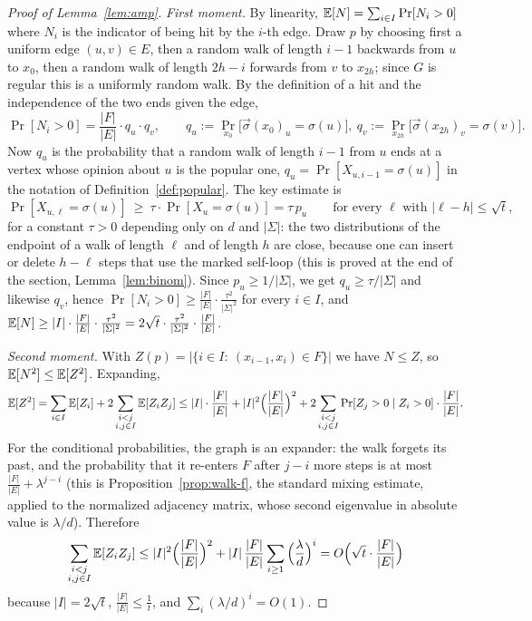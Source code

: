 \begin{proof}[Proof of Lemma~\ref{lem:amp}]
\medskip
\noindent\emph{First moment.}  By linearity, $\operatorname*{\mathbb{E}}[N]=\sum_{i\in I}\Pr[N_i>0]$ where $N_i$ is the indicator of being hit by the $i$-th edge.  Draw $p$ by choosing first a uniform edge $(u,v)\in E$, then a random walk of length $i-1$ backwards from $u$ to $x_0$, then a random walk of length $2h-i$ forwards from $v$ to $x_{2h}$; since $G$ is regular this is a uniformly random walk.
By the definition of a hit and the independence of the two ends given the edge,
\[
  \Pr[N_i>0]=\frac{|F|}{|E|}\cdot q_u\cdot q_v,\qquad q_u:=\Pr_{x_0}\big[\vec\sigma(x_0)_u=\sigma(u)\big],\ q_v:=\Pr_{x_{2h}}\big[\vec\sigma(x_{2h})_v=\sigma(v)\big].
\]
Now $q_u$ is the probability that a random walk of length $i-1$ from $u$ ends at a vertex whose opinion about $u$ is the popular one, \ie $q_u=\Pr[X_{u,i-1}=\sigma(u)]$ in the notation of Definition~\ref{def:popular}.  The key estimate is
\begin{equation}\label{eq:key}
  \Pr[X_{u,\ell}=\sigma(u)]\ \ge\ \tau\cdot\Pr[X_u=\sigma(u)]=\tau\,p_u\qquad\text{for every }\ell\text{ with }|\ell-h|\le\sqrt t,
\end{equation}
for a constant $\tau>0$ depending only on $d$ and $|\Sigma|$: the two distributions of the endpoint of a walk of length $\ell$ and of length $h$ are close, because one can insert or delete $h-\ell$ steps that use the marked self-loop (this is proved at the end of the section, Lemma~\ref{lem:binom}).
Since $p_u\ge1/|\Sigma|$, we get $q_u\ge\tau/|\Sigma|$ and likewise $q_v$, hence $\Pr[N_i>0]\ge\frac{|F|}{|E|}\cdot\frac{\tau^2}{|\Sigma|^2}$ for every $i\in I$, and
$\operatorname*{\mathbb{E}}[N]\ge|I|\cdot\frac{|F|}{|E|}\cdot\frac{\tau^2}{|\Sigma|^2}=2\sqrt t\cdot\frac{\tau^2}{|\Sigma|^2}\cdot\frac{|F|}{|E|}$.

\medskip
\noindent\emph{Second moment.}  With $Z(p)=|\{i\in I:\ (x_{i-1},x_i)\in F\}|$ we have $N\le Z$, so $\operatorname*{\mathbb{E}}[N^2]\le\operatorname*{\mathbb{E}}[Z^2]$.  Expanding,
\[
  \operatorname*{\mathbb{E}}[Z^2]=\sum_{i\in I}\operatorname*{\mathbb{E}}[Z_i]+2\sum_{\substack{i<j\\ i,j\in I}}\operatorname*{\mathbb{E}}[Z_iZ_j] \le |I|\cdot\frac{|F|}{|E|}+|I|^2\Big(\frac{|F|}{|E|}\Big)^2+2\sum_{\substack{i<j\\ i,j\in I}}\Pr[Z_j>0\mid Z_i>0]\cdot\frac{|F|}{|E|}.
\]
For the conditional probabilities, the graph is an expander: the walk forgets its past, and the probability that it re-enters $F$ after $j-i$ more steps is at most $\frac{|F|}{|E|}+\lambda^{j-i}$ (this is Proposition~\ref{prop:walk-f}, the standard mixing estimate, applied to the normalized adjacency matrix, whose second eigenvalue in absolute value is $\lambda/d$).
Therefore
\[
  \sum_{\substack{i<j\\ i,j\in I}}\operatorname*{\mathbb{E}}[Z_iZ_j]\le|I|^2\Big(\frac{|F|}{|E|}\Big)^2+|I|\,\frac{|F|}{|E|}\sum_{i\ge1}\Big(\frac{\lambda}{d}\Big)^{i}=O\Big(\sqrt t\cdot\frac{|F|}{|E|}\Big)
\]
because $|I|=2\sqrt t$, $\frac{|F|}{|E|}\le\frac1t$, and $\sum_i(\lambda/d)^i=O(1)$.
\end{proof}

